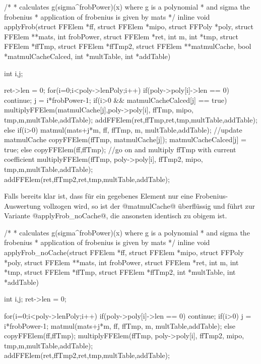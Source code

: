 \begin{ccode}[caption={Aus \url{../Sage/enumeratePCNs.c}},
  firstnumber=773, label=lst:applyFrob]
/*
 * calculates g(sigma^frobPower)(x) where g is a polynomial 
 * and sigma the frobenius
 * application of frobenius is given by mats
 */
inline void applyFrob(struct FFElem *ff, struct FFElem *mipo,
        struct FFPoly *poly,
        struct FFElem **mats,
        int frobPower, struct FFElem *ret, 
        int m, int *tmp, struct FFElem *ffTmp, struct FFElem *ffTmp2,
        struct FFElem **matmulCache, bool *matmulCacheCalced,
        int *multTable, int *addTable){
    int i,j;
        
    ret->len = 0;
    for(i=0;i<poly->lenPoly;i++){
        if(poly->poly[i]->len == 0) continue;
        j = i*frobPower-1;
        if(i>0 && matmulCacheCalced[j] == true){
            multiplyFFElem(matmulCache[j],poly->poly[i],
                    ffTmp, mipo,
                    tmp,m,multTable,addTable);
            addFFElem(ret,ffTmp,ret,tmp,multTable,addTable);
        }else{
            if(i>0){
                matmul(mats+j*m, ff, ffTmp, m, multTable,addTable);
                //update matmulCache
                copyFFElem(ffTmp, matmulCache[j]);
                matmulCacheCalced[j] = true;
            }else{
                copyFFElem(ff,ffTmp);
            }
            //go on and multiply ffTmp with current coefficient
            multiplyFFElem(ffTmp, poly->poly[i],
                    ffTmp2, mipo,
                    tmp,m,multTable,addTable);
            addFFElem(ret,ffTmp2,ret,tmp,multTable,addTable);
        }
    }
}
\end{ccode}

Falls bereits klar ist, dass für ein gegebenes Element nur eine
Frobenius-Auswertung vollzogen wird, so ist der @matmulCache@ überflüssig und
führt zur Variante @applyFrob_noCache@, die ansonsten identisch zu obigem ist.

\begin{ccode}[caption={Aus \url{../Sage/enumeratePCNs.c}},
  firstnumber=827, label=lst:applyFrob_noCache]
/*
 * calculates g(sigma^frobPower)(x) where g is a polynomial 
 * and sigma the frobenius
 * application of frobenius is given by mats
 */
inline void applyFrob_noCache(struct FFElem *ff, struct FFElem *mipo,
        struct FFPoly *poly,
        struct FFElem **mats,
        int frobPower, struct FFElem *ret, 
        int m, int *tmp, struct FFElem *ffTmp, struct FFElem *ffTmp2,
        int *multTable, int *addTable){
    int i,j;
    ret->len = 0;
    
    for(i=0;i<poly->lenPoly;i++){
        if(poly->poly[i]->len == 0) continue;
        if(i>0){
            j = i*frobPower-1;
            matmul(mats+j*m, ff, ffTmp, m, multTable,addTable);
        }else{
            copyFFElem(ff,ffTmp);
        }
        multiplyFFElem(ffTmp, poly->poly[i],
                ffTmp2, mipo,
                tmp,m,multTable,addTable);
        addFFElem(ret,ffTmp2,ret,tmp,multTable,addTable);
    }
}
\end{ccode}


